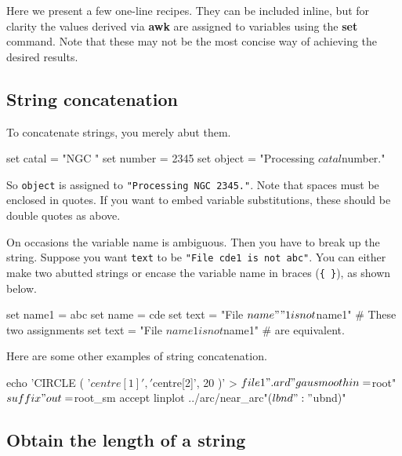 \documentclass[twoside,11pt,nolof]{starlink}
\begin{document}
Here we present a few one-line recipes.  They can be included inline,
but for clarity the values derived via \textbf{awk} are assigned to
variables using the \textbf{set} command.  Note that these may not be the
most concise way of achieving the desired results.

\subsection{String concatenation
\label{sc4_se_string_conc}}

To concatenate strings, you merely abut them.

\begin{small}
\begin{terminalv}
     set catal = "NGC "
     set number = 2345
     set object = "Processing $catal$number."
\end{terminalv}
\end{small}
So \texttt{object} is assigned to \texttt{"Processing NGC 2345."}.
Note that spaces must be enclosed in quotes.  If you want to embed
variable substitutions, these should be double quotes as above.

On occasions the variable name is ambiguous.  Then you have to break up
the string.  Suppose you want \texttt{text} to be \texttt{"File cde1 is not
abc"}.  You can either make two abutted strings or encase the variable
name in braces (\verb+{+~\verb+}+), as shown below.

\begin{small}
\begin{terminalv}
     set name1 = abc
     set name = cde
     set text = "File $name""1 is not $name1"     # These two assignments
     set text = "File ${name}1 is not $name1"     # are equivalent.
\end{terminalv}
\end{small}

Here are some other examples of string concatenation.

\begin{small}
\begin{terminalv}
     echo 'CIRCLE ( '$centre[1]', '$centre[2]', 20 )' > $file1".ard"
     gausmooth in=$root"$suffix" out=${root}_sm accept
     linplot ../arc/near_arc"($lbnd":"$ubnd)"
\end{terminalv}
\end{small}

\newpage
\subsection{Obtain the length of a string
\label{sc4_se_string_length}}
\end{document}
